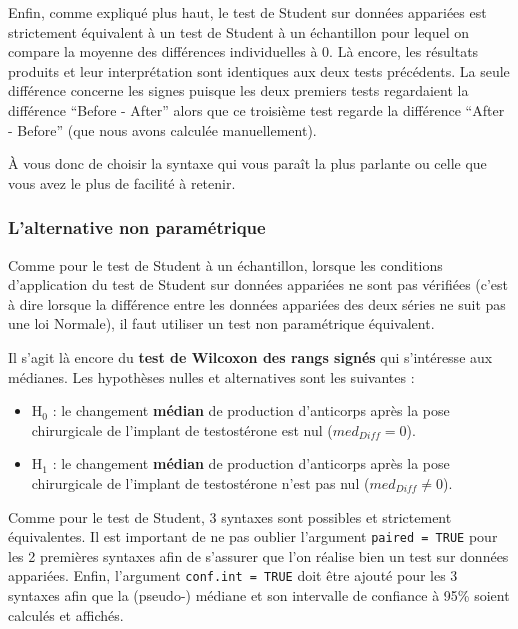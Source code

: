 \documentclass[a4paperpaper,]{article}
\providecommand{\tightlist}{%
  \setlength{\itemsep}{0pt}\setlength{\parskip}{0pt}}
\begin{document}
Enfin, comme expliqué plus haut, le test de Student sur données appariées est strictement équivalent à un test de Student à un échantillon pour lequel on compare la moyenne des différences individuelles à 0. Là encore, les résultats produits et leur interprétation sont identiques aux deux tests précédents. La seule différence concerne les signes puisque les deux premiers tests regardaient la différence ``Before - After'' alors que ce troisième test regarde la différence ``After - Before'' (que nous avons calculée manuellement).

À vous donc de choisir la syntaxe qui vous paraît la plus parlante ou celle que vous avez le plus de facilité à retenir.

\hypertarget{lalternative-non-paramuxe9trique-1}{%
\subsubsection{L'alternative non paramétrique}\label{lalternative-non-paramuxe9trique-1}}

Comme pour le test de Student à un échantillon, lorsque les conditions d'application du test de Student sur données appariées ne sont pas vérifiées (c'est à dire lorsque la différence entre les données appariées des deux séries ne suit pas une loi Normale), il faut utiliser un test non paramétrique équivalent.

Il s'agit là encore du \textbf{test de Wilcoxon des rangs signés} qui s'intéresse aux médianes. Les hypothèses nulles et alternatives sont les suivantes :

\begin{itemize}
\tightlist
\item
  H\(_0\) : le changement \textbf{médian} de production d'anticorps après la pose chirurgicale de l'implant de testostérone est nul (\(med_{Diff} = 0\)).
\item
  H\(_1\) : le changement \textbf{médian} de production d'anticorps après la pose chirurgicale de l'implant de testostérone n'est pas nul (\(med_{Diff} \neq 0\)).
\end{itemize}

Comme pour le test de Student, 3 syntaxes sont possibles et strictement équivalentes. Il est important de ne pas oublier l'argument \texttt{paired\ =\ TRUE} pour les 2 premières syntaxes afin de s'assurer que l'on réalise bien un test sur données appariées. Enfin, l'argument \texttt{conf.int\ =\ TRUE} doit être ajouté pour les 3 syntaxes afin que la (pseudo-) médiane et son intervalle de confiance à 95\% soient calculés et affichés.
\end{document}
